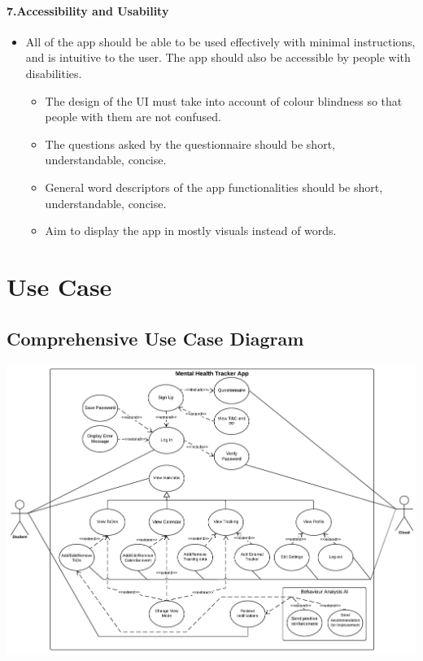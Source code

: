 \documentclass[a4paper,11pt]{article} %
\begin{document}
\hypertarget{accessibility-and-usability}{%
\paragraph{7.Accessibility and
Usability}\label{accessibility-and-usability}}

\begin{itemize}
\item
  All of the app should be able to be used effectively with minimal
  instructions, and is intuitive to the user. The app should also be
  accessible by people with disabilities.

  \begin{itemize}
  \item
    The design of the UI must take into account of colour blindness so
    that people with them are not confused.
  \item
    The questions asked by the questionnaire should be short,
    understandable, concise.
  \item
    General word descriptors of the app functionalities should be short,
    understandable, concise.
  \item
    Aim to display the app in mostly visuals instead of words.
  \end{itemize}
\end{itemize}

\newpage

\section{Use Case}
\subsection{Comprehensive Use Case Diagram}
\begin{center}
\includegraphics[angle=-90, scale=0.7]{img/Usecase_Diagram.pdf}
\end{center}
\end{document}

